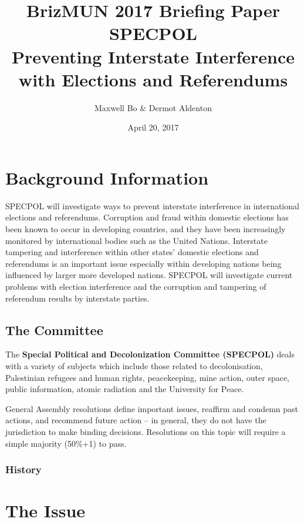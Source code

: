 \documentclass[11pt,a4paper]{report}
\begin{document}
\title{BrizMUN 2017 Briefing Paper \\ SPECPOL \\ Preventing Interstate Interference with Elections and Referendums}
\author{Maxwell Bo \& Dermot Aldenton}
\date{April 20, 2017}
\maketitle


\section{Background Information}

SPECPOL will investigate ways to prevent interstate interference in international elections and referendums. Corruption and fraud within domestic elections has been known to occur in developing countries, and they have been increasingly monitored by international bodies such as the United Nations. Interstate tampering and interference within other states’ domestic elections and referendums is an important issue especially within developing nations being influenced by larger more developed nations. SPECPOL will investigate current problems with election interference and the corruption and tampering of referendum results by interstate parties.

\subsection{The Committee}

The \textbf{Special Political and Decolonization Committee (SPECPOL)} deals with a variety of subjects which include those related to decolonisation, Palestinian refugees and human rights, peacekeeping, mine action, outer space, public information, atomic radiation and the University for Peace. 

General Assembly resolutions define important issues, reaffirm and condemn past actions, and recommend future action – in general, they do not have the jurisdiction to make binding decisions. Resolutions on this topic will require a simple majority (50\%+1) to pass.

\subsubsection{History}

\section{The Issue}
\end{document}
